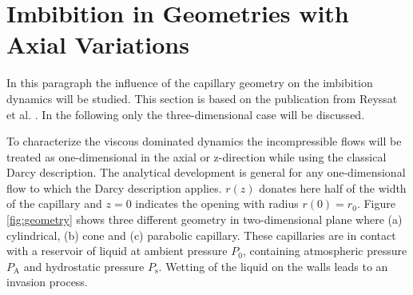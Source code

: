 \documentclass[aip, amsmath, amssymb, reprint, twocolumn, floatfix]{revtex4-1}
\newcommand{\Pa}{P_\mathrm{A}}
\newcommand{\Ps}{P_\mathrm{s}}
\begin{document}
\section{Imbibition in Geometries with Axial Variations}
\label{sec:geometry}

In this paragraph the influence of the capillary geometry on the imbibition dynamics will be studied. This section is based on the publication from Reyssat et al. \cite{Reyssat2008}. In the following only the three-dimensional case will be discussed.
\bigskip

To characterize the viscous dominated dynamics the incompressible flows will be treated as one-dimensional in the axial or z-direction while using the classical Darcy description. The analytical development is general for any one-dimensional flow to which the Darcy description applies. $r(z)$ donates here half of the width of the capillary and $z = 0$ indicates the opening with radius $r(0) = r_0$. Figure \ref{fig:geometry} shows three different geometry in two-dimensional plane where (a) cylindrical, (b) cone and (c) parabolic capillary. These capillaries are in contact with a reservoir of liquid at ambient pressure $P_0$, containing atmospheric pressure $\Pa$ and hydrostatic pressure $\Ps$. Wetting of the liquid on the walls leads to an invasion process.

\begin{center}
	\captionsetup{type=figure}
	
	\label{fig:geometry}
\end{center}
\end{document}
